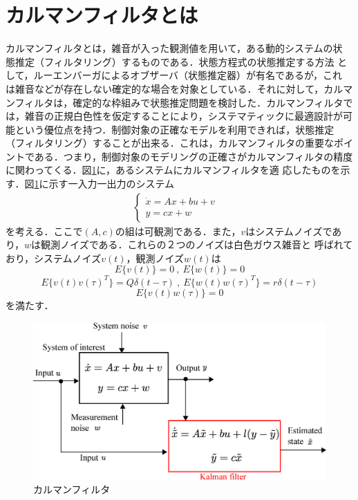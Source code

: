 \documentclass[a4paper,12pt]{jarticle}
\begin{document}
\section{カルマンフィルタとは}
カルマンフィルタとは，雑音が入った観測値を用いて，ある動的システムの状
態推定（フィルタリング）するものである．状態方程式の状態推定する方法
として，ルーエンバーガによるオブザーバ（状態推定器）が有名であるが，これ
は雑音などが存在しない確定的な場合を対象としている．それに対して，カルマ
ンフィルタは，確定的な枠組みで状態推定問題を検討した．カルマンフィルタで
は，雑音の正規白色性を仮定することにより，システマティックに最適設計が可
能という優位点を持つ．制御対象の正確なモデルを利用できれば，状態推定
（フィルタリング）することが出来る．これは，カルマンフィルタの重要なポイ
ントである．つまり，制御対象のモデリングの正確さがカルマンフィルタの精度
に関わってくる．図\ref{fig:kalman_m}に，あるシステムにカルマンフィルタを適
応したものを示す．図\ref{fig:kalman_m}に示す一入力一出力のシステム
\begin{eqnarray}
 \begin{cases}
  \dot{x}=Ax+bu+v & \\
  y = cx + w
  \end{cases}
\end{eqnarray}
を考える．ここで$(A,c)$の組は可観測である．また，$v$はシステムノイズであ
り，$w$は観測ノイズである．これらの２つのノイズは白色ガウス雑音と
呼ばれており，システムノイズ$v(t)$，観測ノイズ$w(t)$は
\begin{equation}\label{equ:ave}
  E \bigl\{v(t)\bigr\} = 0 \ , \ E \bigl\{w(t)\bigr\} = 0 
\end{equation}
%
\begin{equation}\label{equ:soukan}
E \bigl\{v(t)v(\tau)^T\bigr\} = Q\delta (t - \tau) \ , \  E
 \bigl\{w(t)w(\tau)^T\bigr\} = r\delta (t - \tau)
\end{equation}
%
\begin{equation}\label{equ:vw}
  E \bigl\{v(t)w(\tau)\bigr\} = 0 %
\end{equation}
を満たす．
%
\begin{figure}[tbp]
 \begin{center}
  \includegraphics[width = 150mm]{fig/kalman_model.eps}
 \end{center}
 \caption{カルマンフィルタ}
 \label{fig:kalman_m}
\end{figure}
\end{document}
